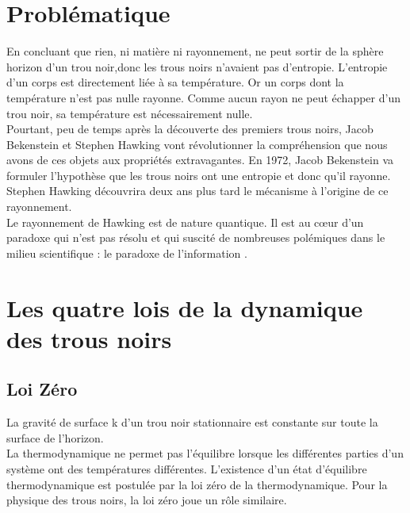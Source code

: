\documentclass[12pt,  a4paper, openright]{report} %
\begin{document}
\section{Problématique}
En concluant que rien, ni matière ni rayonnement, ne peut sortir de la sphère horizon
d'un trou noir,donc  les trous noirs n'avaient pas d'entropie. L'entropie d'un corps est directement liée à sa température. Or un corps dont la température n'est pas nulle rayonne. Comme aucun rayon ne peut échapper d'un trou noir, sa température est nécessairement nulle. \\
Pourtant, peu de temps après la découverte des premiers trous noirs, Jacob Bekenstein et Stephen Hawking vont révolutionner la compréhension que nous avons de ces objets aux propriétés extravagantes. En 1972, Jacob Bekenstein va formuler l'hypothèse que les trous noirs ont une entropie et donc qu'il rayonne. Stephen Hawking découvrira deux ans plus tard le mécanisme à l'origine de ce rayonnement.\\
Le rayonnement de Hawking est de nature quantique. Il est au cœur d'un paradoxe qui n'est pas résolu et qui suscité de nombreuses polémiques dans le milieu scientifique : le paradoxe de l'information \cite{10}.
\section{Les quatre lois de la dynamique des trous noirs}
\subsection{Loi Zéro}
La gravité de surface k d'un trou noir stationnaire est constante sur toute
la surface de l'horizon.\\
La thermodynamique ne permet pas l'équilibre lorsque les différentes parties d'un système ont des températures différentes. L'existence d'un état d'équilibre thermodynamique
est postulée par la loi zéro de la thermodynamique. Pour la physique des trous noirs, la
loi zéro joue un rôle similaire.
\end{document}
